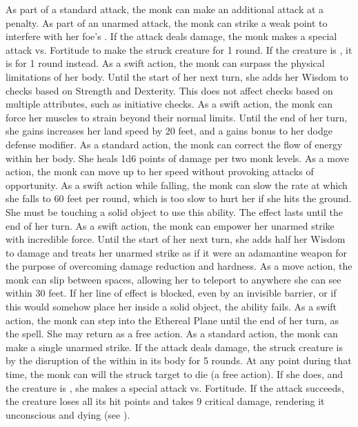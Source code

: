  As part of a standard attack, the monk can make an additional attack at a  penalty.
 As part of an unarmed attack, the monk can strike a weak point to interfere with her foe's \ki. If the attack deals damage, the monk makes a special attack vs. Fortitude to make the struck creature \staggered for 1 round. If the creature is \bloodied, it is \stunned for 1 round instead.
 As a swift action, the monk can surpass the physical limitations of her body. Until the start of her next turn, she adds her Wisdom to checks based on Strength and Dexterity. This does not affect checks based on multiple attributes, such as initiative checks.
 As a swift action, the monk can force her muscles to strain beyond their normal limits. Until the end of her turn, she gains increases her land speed by 20 feet, and a gains  bonus to her dodge defense modifier.
 As a standard action, the monk can correct the flow of energy within her body. She heals 1d6 points of damage per two monk levels.
 As a move action, the monk can move up to her speed without provoking attacks of opportunity.
 As a swift action while falling, the monk can slow the rate at which she falls to 60 feet per round, which is too slow to hurt her if she hits the ground. She must be touching a solid object to use this ability. The effect lasts until the end of her turn.
 As a swift action, the monk can empower her unarmed strike with incredible force. Until the start of her next turn, she adds half her Wisdom to damage and treats her unarmed strike as if it were an adamantine weapon for the purpose of overcoming damage reduction and hardness.
 As a move action, the monk can slip between spaces, allowing her to teleport to anywhere she can see within 30 feet. If her line of effect is blocked, even by an invisible barrier, or if this would somehow place her inside a solid object, the ability fails. 
 As a swift action, the monk can step into the Ethereal Plane until the end of her turn, as the  spell. She may return as a free action.
 As a standard action, the monk can make a single unarmed strike. If the attack deals damage, the struck creature is \sickened by the disruption of the \ki within in its body for 5 rounds. At any point during that time, the monk can will the struck target to die (a free action). If she does, and the creature is \bloodied, she makes a special attack vs. Fortitude. If the attack succeeds, the creature loses all its hit points and takes 9 critical damage, rendering it unconscious and dying (see ).
